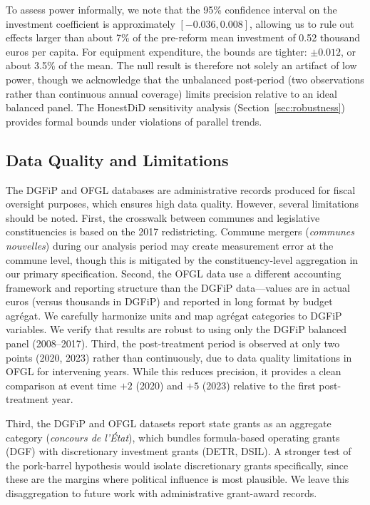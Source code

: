 \documentclass[12pt]{article}
\begin{document}
To assess power informally, we note that the 95\% confidence interval on the investment coefficient is approximately $[-0.036, 0.008]$, allowing us to rule out effects larger than about 7\% of the pre-reform mean investment of 0.52 thousand euros per capita. For equipment expenditure, the bounds are tighter: $\pm 0.012$, or about 3.5\% of the mean. The null result is therefore not solely an artifact of low power, though we acknowledge that the unbalanced post-period (two observations rather than continuous annual coverage) limits precision relative to an ideal balanced panel. The HonestDiD sensitivity analysis (Section~\ref{sec:robustness}) provides formal bounds under violations of parallel trends.

\subsection{Data Quality and Limitations}

The DGFiP and OFGL databases are administrative records produced for fiscal oversight purposes, which ensures high data quality. However, several limitations should be noted. First, the crosswalk between communes and legislative constituencies is based on the 2017 redistricting. Commune mergers (\textit{communes nouvelles}) during our analysis period may create measurement error at the commune level, though this is mitigated by the constituency-level aggregation in our primary specification. Second, the OFGL data use a different accounting framework and reporting structure than the DGFiP data---values are in actual euros (versus thousands in DGFiP) and reported in long format by budget agrégat. We carefully harmonize units and map agrégat categories to DGFiP variables. We verify that results are robust to using only the DGFiP balanced panel (2008--2017). Third, the post-treatment period is observed at only two points (2020, 2023) rather than continuously, due to data quality limitations in OFGL for intervening years. While this reduces precision, it provides a clean comparison at event time $+2$ (2020) and $+5$ (2023) relative to the first post-treatment year.

Third, the DGFiP and OFGL datasets report state grants as an aggregate category (\textit{concours de l'État}), which bundles formula-based operating grants (DGF) with discretionary investment grants (DETR, DSIL). A stronger test of the pork-barrel hypothesis would isolate discretionary grants specifically, since these are the margins where political influence is most plausible. We leave this disaggregation to future work with administrative grant-award records.
\end{document}
